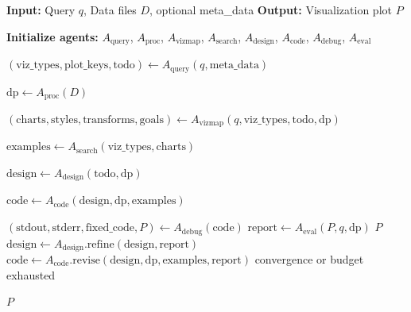 \documentclass[11pt, a4paper, logo, copyright]{googlecloud}
\newcommand{\methodname}{\textbf{\texttt{\textcolor{StarIndigo}{C}\textcolor{StarIndigo}{o}\textcolor{StarCoral}{D}\textcolor{StarTeal}{A}}}}
\begin{document}
\begin{algorithm}
\caption{\methodname{} Multi-Agent Visualization Workflow}
\label{algo:workflow}
\begin{algorithmic}[1]
\State \textbf{Input:} Query $q$, Data files $D$, optional meta\_data
\State \textbf{Output:} Visualization plot $P$

\State \textbf{Initialize agents:} 
$A_{\text{query}}$, 
$A_{\text{proc}}$, 
$A_{\text{vizmap}}$, 
$A_{\text{search}}$, 
$A_{\text{design}}$, 
$A_{\text{code}}$, 
$A_{\text{debug}}$, 
$A_{\text{eval}}$

\State $(\text{viz\_types}, \text{plot\_keys}, \text{todo}) \gets A_{\text{query}}(q, \text{meta\_data})$

\State $\text{dp} \gets A_{\text{proc}}(D)$

\State $(\text{charts}, \text{styles}, \text{transforms}, \text{goals}) \gets 
A_{\text{vizmap}}(q, \text{viz\_types}, \text{todo}, \text{dp})$

\State $\text{examples} \gets A_{\text{search}}(\text{viz\_types}, \text{charts})$

\State $\text{design} \gets A_{\text{design}}(\text{todo}, \text{dp})$

\State $\text{code} \gets A_{\text{code}}(\text{design}, \text{dp}, \text{examples})$

\Repeat
    \State $(\text{stdout}, \text{stderr}, \text{fixed\_code}, P) \gets A_{\text{debug}}(\text{code})$
    \State $\text{report} \gets A_{\text{eval}}(P, q, \text{dp})$
        \State \Return $P$
    \Else
        \State $\text{design} \gets A_{\text{design}}.\text{refine}(\text{design}, \text{report})$
        \State $\text{code} \gets A_{\text{code}}.\text{revise}(\text{design}, \text{dp}, \text{examples}, \text{report})$
    \EndIf
\Until convergence or budget exhausted

\State \Return $P$ 
\end{algorithmic}
\end{algorithm}
\end{document}
